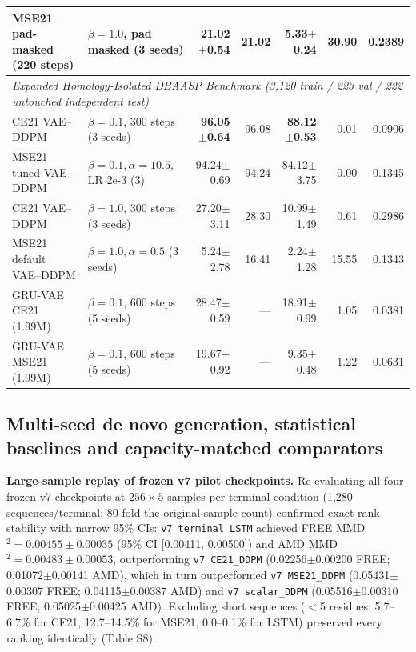 \documentclass[unnumsec,webpdf,contemporary,large]{oup-authoring-template}
\newcommand{\rev}[1]{#1}
\begin{document}
\begin{table}[t]
\begin{tabular}{llrrrrr}
\rev{MSE21 pad-masked (220 steps)} & \rev{$\beta=1.0$, pad masked (3 seeds)} & \rev{21.02$\pm$0.54} & \rev{21.02} & \rev{5.33$\pm$0.24} & \rev{30.90} & \rev{0.2389} \\
\midrule
\multicolumn{7}{l}{\textit{\rev{Expanded Homology-Isolated DBAASP Benchmark (3,120 train / 223 val / 222 untouched independent test)}}} \\
\rev{CE21 VAE--DDPM} & \rev{$\beta=0.1$, 300 steps (3 seeds)} & \rev{\textbf{96.05$\pm$0.64}} & \rev{96.08} & \rev{\textbf{88.12$\pm$0.53}} & \rev{0.01} & \rev{0.0906} \\
\rev{MSE21 tuned VAE--DDPM} & \rev{$\beta=0.1, \alpha=10.5$, LR 2e-3 (3)} & \rev{94.24$\pm$0.69} & \rev{94.24} & \rev{84.12$\pm$3.75} & \rev{0.00} & \rev{0.1345} \\
\rev{CE21 VAE--DDPM} & \rev{$\beta=1.0$, 300 steps (3 seeds)} & \rev{27.20$\pm$3.11} & \rev{28.30} & \rev{10.99$\pm$1.49} & \rev{0.61} & \rev{0.2986} \\
\rev{MSE21 default VAE--DDPM} & \rev{$\beta=1.0, \alpha=0.5$ (3 seeds)} & \rev{5.24$\pm$2.78} & \rev{16.41} & \rev{2.24$\pm$1.28} & \rev{15.55} & \rev{0.1343} \\
\rev{GRU-VAE CE21 (1.99M)} & \rev{$\beta=0.1$, 600 steps (5 seeds)} & \rev{28.47$\pm$0.59} & \rev{---} & \rev{18.91$\pm$0.99} & \rev{1.05} & \rev{0.0381} \\
\rev{GRU-VAE MSE21 (1.99M)} & \rev{$\beta=0.1$, 600 steps (5 seeds)} & \rev{19.67$\pm$0.92} & \rev{---} & \rev{9.35$\pm$0.48} & \rev{1.22} & \rev{0.0631} \\
\bottomrule
\end{tabular}
\end{table}

\subsection{Multi-seed de novo generation, statistical baselines and capacity-matched comparators}

\rev{\textbf{Large-sample replay of frozen v7 pilot checkpoints.} Re-evaluating all four frozen v7 checkpoints at $256\times 5$ samples per terminal condition (1,280 sequences/terminal; 80-fold the original sample count) confirmed exact rank stability with narrow 95\% CIs: \texttt{v7 terminal\_LSTM} achieved FREE MMD$^2=0.00455\pm 0.00035$ (95\% CI [0.00411, 0.00500]) and AMD MMD$^2=0.00483\pm 0.00053$, outperforming \texttt{v7 CE21\_DDPM} (0.02256$\pm$0.00200 FREE; 0.01072$\pm$0.00141 AMD), which in turn outperformed \texttt{v7 MSE21\_DDPM} (0.05431$\pm$0.00307 FREE; 0.04115$\pm$0.00387 AMD) and \texttt{v7 scalar\_DDPM} (0.05516$\pm$0.00310 FREE; 0.05025$\pm$0.00425 AMD). Excluding short sequences ($<$5 residues: 5.7--6.7\% for CE21, 12.7--14.5\% for MSE21, 0.0--0.1\% for LSTM) preserved every ranking identically (Table S8).}
\end{document}
